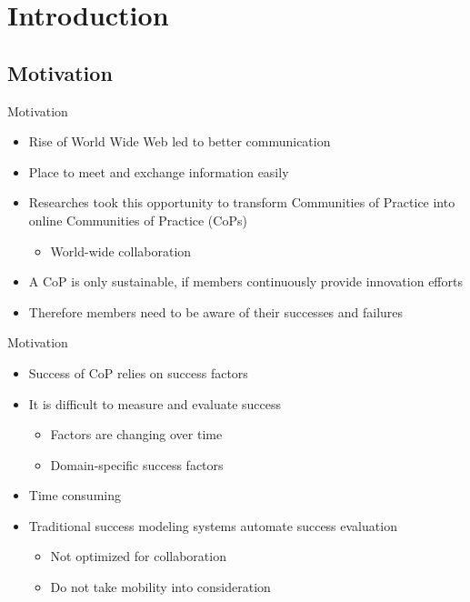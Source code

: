 \section{Introduction}

\subsection{Motivation}


\begin{frame}{Motivation}
  \begin{itemize}
    \item Rise of World Wide Web led to better communication
    \item Place to meet and exchange information easily
    \item Researches took this opportunity to transform Communities of Practice into online Communities of Practice (CoPs)
          \begin{itemize}
            \item World-wide collaboration
          \end{itemize}
    \item A CoP is only sustainable, if members continuously provide innovation efforts \cite{RKJa15}
    \item Therefore members need to be aware of their successes and failures
  \end{itemize}

\end{frame}

\begin{frame}{Motivation}
  \begin{itemize}
    \item Success of CoP relies on success factors
    \item It is difficult to measure and evaluate success
          \begin{itemize}
            \item Factors are changing over time \cite{Renz08}
            \item Domain-specific success factors
          \end{itemize}
    \item Time consuming
    \item Traditional success modeling systems automate success evaluation
          \begin{itemize}
            \item Not optimized for collaboration
            \item Do not take mobility into consideration \cite{Renz08}
          \end{itemize}
  \end{itemize}
\end{frame}

